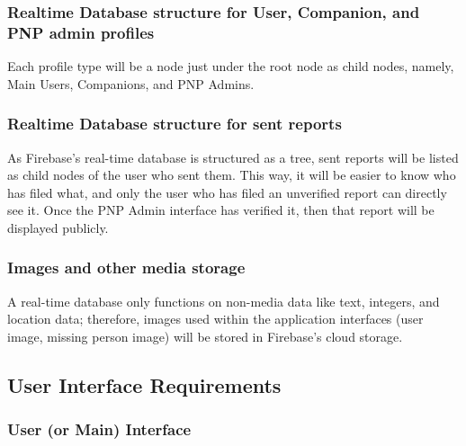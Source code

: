 \subsubsection{Realtime Database structure for User, Companion, and PNP admin profiles}
Each profile type will be a node just under the root node as child nodes, namely, Main Users, Companions, and PNP Admins. 

\subsubsection{Realtime Database structure for sent reports}
As Firebase’s real-time database is structured as a tree, sent reports will be listed as child nodes of the user who sent them. This way, it will be easier to know who has filed what, and only the user who has filed an unverified report can directly see it. Once the PNP Admin interface has verified it, then that report will be displayed publicly.

\subsubsection{Images and other media storage}
A real-time database only functions on non-media data like text, integers, and location data; therefore, images used within the application interfaces (user image, missing person image) will be stored in Firebase’s cloud storage.

\subsection{User Interface Requirements}
\subsubsection{User (or Main) Interface}

